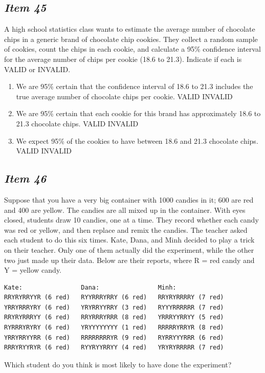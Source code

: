\subsection{\textbf{\textit{Item 45}}}
A high school statistics class wants to estimate the average number of chocolate chips in a generic brand of chocolate chip cookies. They collect a random sample of cookies, count the chips in each cookie, and calculate a 95\% confidence interval for the average number of chips per cookie (18.6 to 21.3). Indicate if each is VALID or INVALID.
\begin{enumerate} [leftmargin=1cm, itemsep=.2em]
\item We are 95\% certain that the confidence interval of 18.6 to 21.3 includes the true average number of chocolate chips per cookie.     VALID   INVALID
\item We are 95\% certain that each cookie for this brand has approximately 18.6 to 21.3 chocolate chips.     VALID   INVALID
\item We expect 95\% of the cookies to have between 18.6 and 21.3 chocolate chips.     VALID   INVALID
\end{enumerate}

\subsection{\textbf{\textit{Item 46}}}
Suppose that you have a very big container with 1000 candies in it; 600 are red and 400 are yellow. The candies are all mixed up in the container. With eyes closed, students draw 10 candies, one at a time. They record whether each candy was red or yellow, and then replace and remix the candies. The teacher asked each student to do this six times. Kate, Dana, and Minh decided to play a trick on their teacher. Only one of them actually did the experiment, while the other two just made up their data. Below are their reports, where R = red candy and Y = yellow candy.
\begin{verbatim}
Kate:                Dana:                Minh:
RRYRYRRYYR (6 red)   RYYRRRYRRY (6 red)   RRYRYRRRRY (7 red)
YRRYRRRYRY (6 red)   YRYRRYYRRY (3 red)   RYYYRRRRRR (7 red)
RRYRYRRRYY (6 red)   RRYRRRYRRR (8 red)   YRRRYYRRYY (5 red)
RYRRRYRYRY (6 red)   YRYYYYYYYY (1 red)   RRRRRYRRYR (8 red)
YRRYRRYYRR (6 red)   RRRRRRRRYR (9 red)   RYRRYYYRRR (6 red)
RRRYRYYRYR (6 red)   RYYRYYRRYY (4 red)   YRYRYRRRRR (7 red)
\end{verbatim}
Which student do you think is most likely to have done the experiment?

